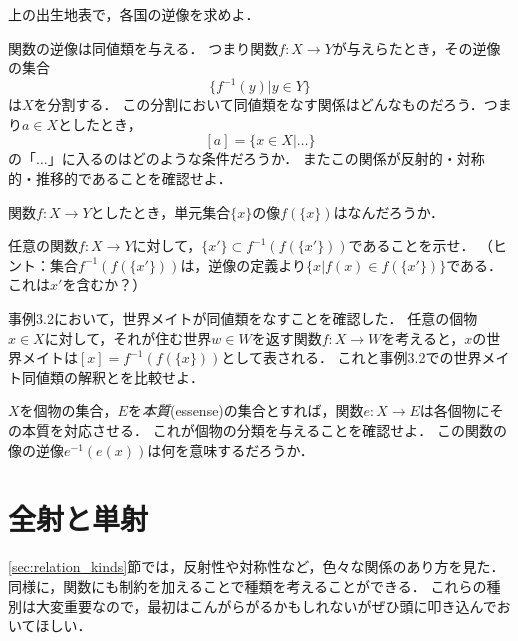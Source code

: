 \documentclass[11pt,a4paper]{jsarticle} %
\begin{document}
\begin{exercise}
 上の出生地表で，各国の逆像を求めよ．
\end{exercise}

\begin{exercise}
関数の逆像は同値類を与える．
つまり関数$f:X \to Y$が与えらたとき，その逆像の集合
\[
 \{f^{-1}(y) | y \in Y\}
\]
は$X$を分割する．
この分割において同値類をなす関係はどんなものだろう．つまり$a \in X$としたとき，
\[
 [a] = \{x \in X |\dots \}
\]
の「$\dots$」に入るのはどのような条件だろうか．
またこの関係が反射的・対称的・推移的であることを確認せよ．
\end{exercise}


\begin{exercise}
関数$f:X \to Y$としたとき，単元集合$\{x\}$の像$f(\{x\})$はなんだろうか．
\end{exercise}



\begin{exercise}
 任意の関数$f:X \to Y$に対して，$\{x'\} \subset f^{-1}(f(\{x'\}))$であることを示せ．
（ヒント：集合$f^{-1}(f(\{x'\}))$は，逆像の定義より$\{ x | f(x) \in f(\{x'\}) \}$である．これは$x'$を含むか？）
\end{exercise}


\begin{example}
 事例3.2において，世界メイトが同値類をなすことを確認した．
 任意の個物$x \in X$に対して，それが住む世界$w \in W$を返す関数$f:X \to W$を考えると，$x$の世界メイトは$[x] = f^{-1}(f(\{x\}))$として表される．
 これと事例3.2での世界メイト同値類の解釈とを比較せよ．
\end{example}


\begin{example}
\label{eg:essence}
$X$を個物の集合，$E$を\emph{本質}(essense)の集合とすれば，関数$e:X \to E$は各個物にその本質を対応させる．
これが個物の分類を与えることを確認せよ．
この関数の像の逆像$e^{-1} (e(x))$は何を意味するだろうか．
\end{example}


\section{全射と単射}
\ref{sec:relation_kinds}節では，反射性や対称性など，色々な関係のあり方を見た．
同様に，関数にも制約を加えることで種類を考えることができる．
これらの種別は大変重要なので，最初はこんがらがるかもしれないがぜひ頭に叩き込んでおいてほしい．
\end{document}
